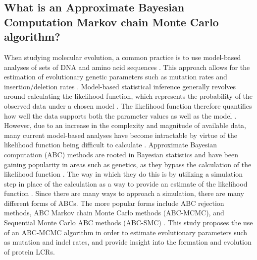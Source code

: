 \documentclass{article}
\begin{document}
\subsection{What is an Approximate Bayesian Computation Markov chain Monte Carlo algorithm?}
When studying molecular evolution, a common practice is to use model-based analyses of sets of DNA and amino acid
sequences \citep{laurin2022jump}. This approach allows for the estimation of evolutionary genetic parameters such as
mutation rates and insertion/deletion rates \citep{wu2015estimation}. Model-based statistical inference generally revolves around
calculating the likelihood function, which represents the probability of the observed data under a chosen model \citep{sunnaaker2013approximate}. The likelihood function therefore quantifies how well the data supports both the parameter values as well as the model \citep{sunnaaker2013approximate}. However, due to an increase in the complexity and magnitude of available data, many current model-based analyses have become intractable by virtue of the likelihood function being difficult to calculate \citep{marjoram2013approximation}. Approximate Bayesian computation (ABC) methods are rooted in Bayesian statistics and have been gaining popularity in areas such as genetics, as they bypass the calculation of the likelihood function \citep{sunnaaker2013approximate}. The way in which they do this is by utilizing a simulation step in place of the calculation as a way to provide an estimate of the likelihood function \citep{marjoram2013approximation}. Since there are many ways to approach a simulation, there are many different forms of ABCs. The more popular forms include ABC rejection methods, ABC Markov chain Monte Carlo methods (ABC-MCMC), and Sequential Monte Carlo ABC methods (ABC-SMC) \citep{marjoram2013approximation}. This study proposes the use of an ABC-MCMC algorithm in order to estimate evolutionary parameters such as mutation and indel rates, and provide insight into the formation and evolution of protein LCRs.
\end{document}

